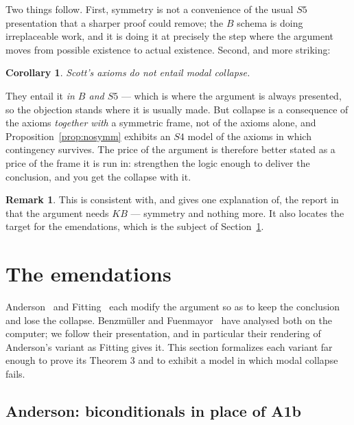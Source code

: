 \documentclass[11pt]{article}
\theoremstyle{plain}
\newtheorem{corollary}[theorem]{Corollary}
\theoremstyle{definition}
\newtheorem{remark}[theorem]{Remark}
\begin{document}
Two things follow. First, symmetry is not a convenience of the usual $S5$
presentation that a sharper proof could remove; the $B$ schema is doing
irreplaceable work, and it is doing it at precisely the step where the argument
moves from possible existence to actual existence. Second, and more striking:

\begin{corollary}\label{cor:nocollapse}
Scott's axioms do not entail modal collapse.
\end{corollary}

\noindent
They entail it \emph{in $B$ and $S5$} --- which is where the argument is always
presented, so the objection stands where it is usually made. But collapse is a
consequence of the axioms \emph{together with} a symmetric frame, not of the
axioms alone, and Proposition~\ref{prop:nosymm} exhibits an $S4$ model of the
axioms in which contingency survives. The price of the argument is therefore
better stated as a price of the frame it is run in: strengthen the logic enough
to deliver the conclusion, and you get the collapse with it.

\begin{remark}
This is consistent with, and gives one explanation of, the report
in~\cite{bwp2016} that the argument needs $KB$ --- symmetry and nothing more.
It also locates the target for the emendations, which is the subject of
Section~\ref{sec:variants}.
\end{remark}

\section{The emendations}\label{sec:variants}

Anderson~\cite{anderson} and Fitting~\cite{fitting} each modify the argument so
as to keep the conclusion and lose the collapse. Benzm\"uller and
Fuenmayor~\cite{bf2020} have analysed both on the computer; we follow their
presentation, and in particular their rendering of Anderson's variant as
Fitting gives it. This section formalizes each variant far enough to prove its
Theorem 3 and to exhibit a model in which modal collapse fails.

\subsection{Anderson: biconditionals in place of {\rm A1b}}
\end{document}
